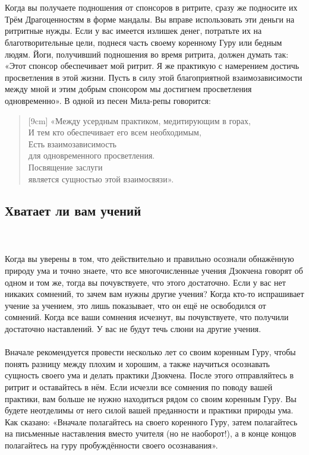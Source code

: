 \newpage
\\ \\ Когда вы получаете подношения от спонсоров в ритрите, сразу же подносите их Трём Драгоценностям в форме мандалы. Вы вправе использовать эти деньги на ритритные нужды. Если у вас имеется излишек денег, потратьте их на благотворительные цели, поднеся часть своему коренному Гуру или бедным людям. Йоги, получивший подношения во время ритрита, должен думать так: «Этот спонсор обеспечивает мой ритрит. Я же практикую с намерением достичь просветления в этой жизни. Пусть в силу этой благоприятной взаимозависимости между мной и этим добрым спонсором мы достигнем просветления одновременно». В одной из песен Мила-репы говорится:

\begin{verse}[9cm]
«Между усердным практиком, медитирующим в горах,\\
И тем кто обеспечивает его всем необходимым,\\
Есть взаимозависимость \\ \indent для одновременного просветления.\\
Посвящение заслуги \\ \indent является сущностью этой взаимосвязи».
\end{verse}

\subsection{Хватает ли вам учений}
\\ \\ Когда вы уверены в том, что действительно и правильно осознали обнажённую природу ума и точно знаете, что все многочисленные учения Дзокчена говорят об одном и том же, тогда вы почувствуете, что этого достаточно. Если у вас нет никаких сомнений, то зачем вам нужны другие учения? Когда кто-то испрашивает учение за учением, это лишь показывает, что он ещё не освободился от сомнений. Когда все ваши сомнения исчезнут, вы почувствуете, что получили достаточно наставлений. У вас не будут течь слюни на другие учения.
\\ \\ Вначале рекомендуется провести несколько лет со своим коренным Гуру, чтобы понять разницу между плохим и хорошим, а также научиться осознавать сущность своего ума и делать практики Дзокчена. После этого отправляйтесь в ритрит и оставайтесь в нём. Если исчезли все сомнения по поводу вашей практики, вам больше не нужно находиться рядом со своим коренным Гуру. Вы будете неотделимы от него силой вашей преданности и практики природы ума. Как сказано: «Вначале полагайтесь на своего коренного Гуру, затем полагайтесь на письменные наставления вместо учителя (но не наоборот!), а в конце концов полагайтесь на гуру пробуждённости своего осознавания».
